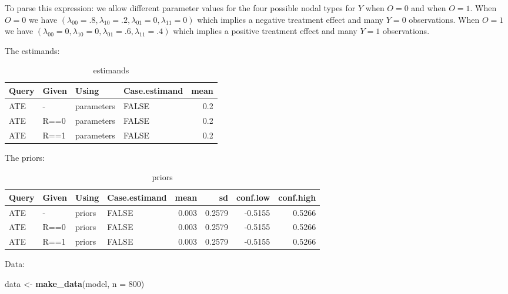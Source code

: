 \documentclass[
  12pt,
]{book}
\newenvironment{Shaded}{\begin{snugshade}}{\end{snugshade}}
\newcommand{\AttributeTok}[1]{\textcolor[rgb]{0.13,0.29,0.53}{#1}}
\newcommand{\DecValTok}[1]{\textcolor[rgb]{0.00,0.00,0.81}{#1}}
\newcommand{\FunctionTok}[1]{\textcolor[rgb]{0.13,0.29,0.53}{\textbf{#1}}}
\newcommand{\NormalTok}[1]{#1}
\newcommand{\OtherTok}[1]{\textcolor[rgb]{0.56,0.35,0.01}{#1}}
\begin{document}
To parse this expression: we allow different parameter values for the four possible nodal types for \(Y\) when \(O=0\) and when \(O=1\). When \(O=0\) we have \((\lambda_{00} = .8, \lambda_{10} = .2, \lambda_{01} = 0, \lambda_{11} = 0)\) which implies a negative treatment effect and many \(Y=0\) observations. When \(O=1\) we have \((\lambda_{00} = 0, \lambda_{10} = 0, \lambda_{01} = .6, \lambda_{11} = .4)\) which implies a positive treatment effect and many \(Y=1\) observations.

The estimands:

\begin{table}

\caption{\label{tab:unnamed-chunk-115}estimands}
\centering
\begin{tabular}[t]{l|l|l|l|r}
\hline
Query & Given & Using & Case.estimand & mean\\
\hline
ATE & - & parameters & FALSE & 0.2\\
\hline
ATE & R==0 & parameters & FALSE & 0.2\\
\hline
ATE & R==1 & parameters & FALSE & 0.2\\
\hline
\end{tabular}
\end{table}

The priors:

\begin{table}

\caption{\label{tab:appcombexpobs2}priors}
\centering
\begin{tabular}[t]{l|l|l|l|r|r|r|r}
\hline
Query & Given & Using & Case.estimand & mean & sd & conf.low & conf.high\\
\hline
ATE & - & priors & FALSE & 0.003 & 0.2579 & -0.5155 & 0.5266\\
\hline
ATE & R==0 & priors & FALSE & 0.003 & 0.2579 & -0.5155 & 0.5266\\
\hline
ATE & R==1 & priors & FALSE & 0.003 & 0.2579 & -0.5155 & 0.5266\\
\hline
\end{tabular}
\end{table}

Data:

\begin{Shaded}
\begin{Highlighting}[]
\NormalTok{data }\OtherTok{\textless{}{-}} \FunctionTok{make\_data}\NormalTok{(model, }\AttributeTok{n =} \DecValTok{800}\NormalTok{)}
\end{Highlighting}
\end{Shaded}
\end{document}
